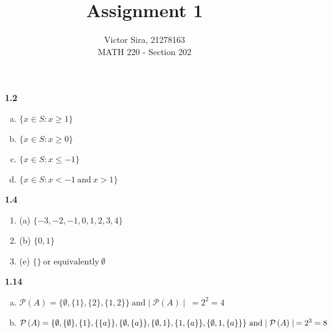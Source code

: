 \documentclass[12pt]{article}
\newcommand{\pow}[1]{ \mathcal{P}\left(#1\right) }
\begin{document}
 
 
 
\title{Assignment 1}%
\author{Victor Sira, 21278163\\ %
MATH 220 - Section 202} %
 
\maketitle
 
\begin{itemize}
    
    \item[\bf{1.2}]
    
        \begin{enumerate}[(a)]
            \item $\{x\in S: x\geq1\}$
            \item $\{x\in S: x\geq0\}$
            \item $\{x\in S: x\leq-1\}$
            \item $\{x\in S: x < -1 \ \text{and} \ x > 1\}$
        \end{enumerate}
    
    \item[\bf{1.4}]
    
        \begin{enumerate}[]
            \item (a) $\{-3,-2,-1,0,1,2,3,4\}$
            \item (b) $\{0,1\}$
            \item (e) $\{\} \ \text{or equivalently} \ \emptyset $
        \end{enumerate}
    
    \item[\bf{1.14}]
    
        \begin{enumerate}[(a)]
            \item $ \pow{A}= \{ \emptyset,\{1\}, \{2\}, \{1,2\}\} \ \text{and} \mid \pow{A} \mid \: = 2^2=4$
            \item $ \pow{A}= \{\emptyset,\{\emptyset\}, \{1\}, \{\{a\}\}, \{\emptyset,\{a\}\}, \{\emptyset, 1\}, \{1,\{a\}\}, \{\emptyset, 1, \{a\}\}\} \ \text{and} \\
            \mid \pow{A} \mid \: =2^3 = 8$
        \end{enumerate}
    

\end{itemize}
\end{document}
